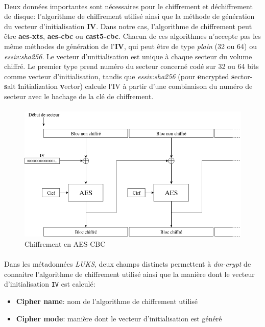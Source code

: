 \paragraph{}
Deux données importantes sont nécessaires pour le chiffrement et déchiffrement
de disque: l'algorithme de chiffrement utilisé ainsi que la méthode de
génération du vecteur d'initialisation \textbf{IV}. Dans notre cas, l'algorithme
de chiffrement peut être \textbf{aes-xts}, \textbf{aes-cbc} ou
\textbf{cast5-cbc}. Chacun de ces algorithmes n'accepte pas les même méthodes de
génération de l'\textbf{IV}, qui peut être de type \textit{plain} (32 ou 64) ou
\textit{essiv:sha256}. Le vecteur d'unitialisation est unique à chaque secteur
du volume chiffré. Le premier type prend numéro du secteur concerné codé sur 32
ou 64 bits comme vecteur d'initialisation, tandis que \textit{essiv:sha256}
(pour \textbf{e}ncrypted \textbf{s}ector-\textbf{s}alt \textbf{i}nitialization
\textbf{v}ector) calcule l'IV à partir d'une combinaison du numéro de secteur
avec le hachage de la clé de chiffrement.
\paragraph{}
\begin{figure}[h]
\centering
\includegraphics[width=.9\linewidth]{choix_developpement/aes_cbc.png}
\caption{\label{fig:aes_cbc}Chiffrement en AES-CBC}
\end{figure}
\paragraph{}
Dans les métadonnées \textit{LUKS}, deux champs distincts permettent à
\textit{dm-crypt} de connaitre l'algorithme de chiffrement utilisé ainsi que la
manière dont le vecteur d'initialisation \texttt{IV} est calculé:
\begin{itemize}
\item \textbf{Cipher name}: nom de l'algorithme de chiffrement utilisé
\item \textbf{Cipher mode}: manière dont le vecteur d'initialisation est généré
\end{itemize}
